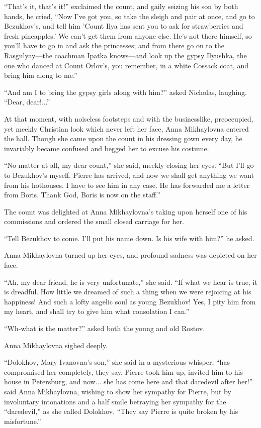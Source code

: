 ``That's it, that's it!'' exclaimed the count, and gaily seizing
his son by both hands, he cried, ``Now I've got you, so take the
sleigh and pair at once, and go to Bezukhov's, and tell him
'Count Ilya has sent you to ask for strawberries and fresh
pineapples.' We can't get them from anyone else. He's not there
himself, so you'll have to go in and ask the princesses; and from
there go on to the Rasgulyay---the coachman Ipatka knows---and
look up the gypsy Ilyushka, the one who danced at Count Orlov's,
you remember, in a white Cossack coat, and bring him along to
me.''

``And am I to bring the gypsy girls along with him?'' asked
Nicholas, laughing. ``Dear, dear!...''

At that moment, with noiseless footsteps and with the
businesslike, preoccupied, yet meekly Christian look which never
left her face, Anna Mikhaylovna entered the hall. Though she came
upon the count in his dressing gown every day, he invariably
became confused and begged her to excuse his costume.

``No matter at all, my dear count,'' she said, meekly closing her
eyes.  ``But I'll go to Bezukhov's myself. Pierre has arrived,
and now we shall get anything we want from his hothouses. I have
to see him in any case.  He has forwarded me a letter from
Boris. Thank God, Boris is now on the staff.''

The count was delighted at Anna Mikhaylovna's taking upon herself
one of his commissions and ordered the small closed carriage for
her.

``Tell Bezukhov to come. I'll put his name down. Is his wife with
him?''  he asked.

Anna Mikhaylovna turned up her eyes, and profound sadness was
depicted on her face.

``Ah, my dear friend, he is very unfortunate,'' she said. ``If
what we hear is true, it is dreadful. How little we dreamed of
such a thing when we were rejoicing at his happiness! And such a
lofty angelic soul as young Bezukhov! Yes, I pity him from my
heart, and shall try to give him what consolation I can.''

``Wh-what is the matter?'' asked both the young and old Rostov.

Anna Mikhaylovna sighed deeply.

``Dolokhov, Mary Ivanovna's son,'' she said in a mysterious
whisper, ``has compromised her completely, they say. Pierre took
him up, invited him to his house in Petersburg, and now... she
has come here and that daredevil after her!'' said Anna
Mikhaylovna, wishing to show her sympathy for Pierre, but by
involuntary intonations and a half smile betraying her sympathy
for the ``daredevil,'' as she called Dolokhov. ``They say Pierre
is quite broken by his misfortune.''

